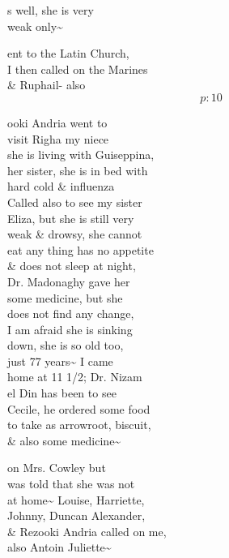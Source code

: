 \documentclass{report}
\begin{document}
	\par{
 	s well, she is very\ \\weak only\~{}\ \\
	}

	\par{
 	ent to the Latin Church,\ \\I then called on the Marines\ \\\& Ruphail- also\ \\
  \[p: 10 \]

	}

	\par{
 	ooki Andria went to\ \\visit Righa my niece\ \\she is living with Guiseppina,\ \\her sister, she is in bed with\ \\hard cold \& influenza\ \\Called also to see my sister\ \\Eliza, but she is still very\ \\weak \& drowsy, she cannot\ \\eat any thing has no appetite\ \\\& does not sleep at night,\ \\Dr. Madonaghy gave her\ \\some medicine, but she\ \\does not find any change,\ \\I am afraid she is sinking\ \\down, she is so old too,\ \\just 77 years\~{} I came\ \\home at 11 1/2; Dr. Nizam\ \\el Din has been to see\ \\Cecile, he ordered some food\ \\to take as arrowroot, biscuit,\ \\\& also some medicine\~{}\ \\
	}

	\par{
 	on Mrs. Cowley but\ \\was told that she was not\ \\at home\~{} Louise, Harriette,\ \\Johnny, Duncan Alexander,\ \\\& Rezooki Andria called on me,\ \\also Antoin Juliette\~{}\ \\
	}
\end{document}
